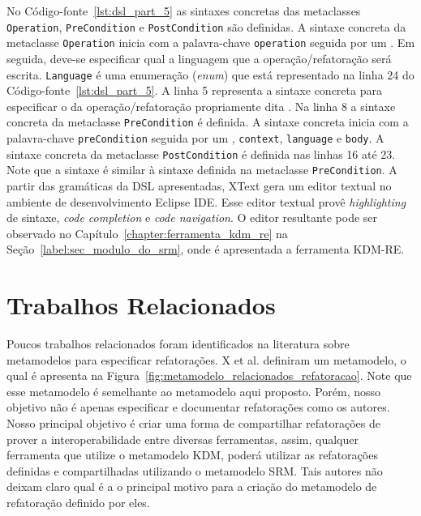 No Código-fonte~\ref{lst:dsl_part_5} as sintaxes concretas das metaclasses \texttt{Operation}, \texttt{PreCondition} e \texttt{PostCondition} são definidas. A sintaxe concreta da metaclasse \texttt{Operation} inicia com a palavra-chave \texttt{operation} seguida por um \aspas{\{}. Em seguida, deve-se especificar qual a linguagem que a operação/refatoração será escrita. \texttt{Language} é uma enumeração (\textit{enum}) que está representado na linha 24 do Código-fonte~\ref{lst:dsl_part_5}. A linha 5 representa a sintaxe concreta para especificar o  da operação/refatoração propriamente dita . Na linha 8 a sintaxe concreta da metaclasse \texttt{PreCondition} é definida. A sintaxe concreta inicia com a palavra-chave \texttt{preCondition} seguida por um \aspas{\{}, \texttt{context}, \texttt{language} e \texttt{body}. A sintaxe concreta da metaclasse \texttt{PostCondition} é definida nas linhas 16 até 23. Note que a sintaxe é similar à sintaxe definida na metaclasse \texttt{PreCondition}. A partir das gramáticas da DSL apresentadas, XText gera um editor textual no ambiente de desenvolvimento Eclipse IDE. Esse editor textual provê \textit{highlighting} de sintaxe, \textit{code completion} e \textit{code navigation}. O editor resultante pode ser observado no Capítulo~\ref{chapter:ferramenta_kdm_re} na Seção~\ref{label:sec_modulo_do_srm}, onde é apresentada a ferramenta KDM-RE.


\section{Trabalhos Relacionados}\label{sec:trabalhos_relacionais_SRM}

Poucos trabalhos relacionados foram identificados na literatura sobre metamodelos para especificar refatorações. X et al. definiram um metamodelo, o qual é apresenta na Figura~\ref{fig:metamodelo_relacionados_refatoracao}. Note que esse metamodelo é semelhante ao metamodelo aqui proposto. Porém, nosso objetivo não é apenas especificar e documentar refatorações como os autores. Nosso principal objetivo é criar uma forma de compartilhar refatorações de prover a interoperabilidade entre diversas ferramentas, assim, qualquer ferramenta que utilize o metamodelo KDM, poderá utilizar as refatorações definidas e compartilhadas utilizando o metamodelo SRM. Tais autores não deixam claro qual é a o principal motivo para a criação do metamodelo de refatoração definido por eles.


